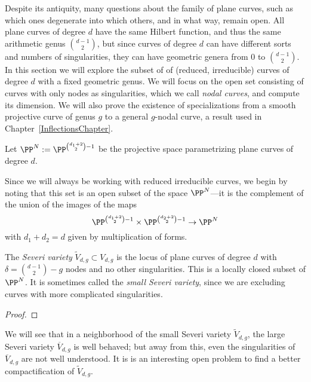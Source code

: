 Despite its antiquity, many questions about the family of plane curves, such as which ones degenerate into which others, and in what way, remain open. All plane curves of degree $d$ have the same Hilbert function, and thus the same arithmetic genus
$\binom{d-1}{2}$, but since curves of degree $d$ can have different sorts and numbers of singularities, they can have geometric genera from 0 to $\binom{d-1}{2}$. In this section we will explore the subset of of (reduced, irreducible) curves of degree $d$ with a fixed geometric genus. We will focus on the open set consisting of curves with only nodes as singularities, which we call \emph{nodal curves}, and compute its dimension. We will also prove the existence of specializations from a smooth projective curve of genus $g$ to a general $g$-nodal curve, a result used in Chapter~\ref{InflectionsChapter}.

Let $\PP^N := \PP^{{d_1+2\choose 2} - 1}$ be the projective space parametrizing plane curves of degree $d$.

Since we will always be working with reduced irreducible curves, we begin by noting that this set is an open subset of the space 
$\PP^N$---it is the complement of the union of the images of the maps 
$$
\PP^{{d_1+2\choose 2} - 1}\times\PP^{{d_2+2\choose 2}-1} \to \PP^N
$$ 
with $d_1+d_2 = d$ given by multiplication of forms.

\def\Vdg{{V_{d,g}}}
\def\Vdgtilde{{\widetilde{V}_{d,g}}} 
\def\Vdgbar{{\overline{V}_{d,g}}} 
\begin{propdef}
The \emph{Severi variety} $\widetilde V_{d,g} \subset V_{d,g}$ is the locus of plane curves of degree $d$ with $\delta = \binom{d-1}{2} - g$ nodes and no other singularities. This is a locally closed subset of $\PP^N$. It is sometimes
called the \emph{small Severi variety}, since we are excluding curves with more complicated singularities.

\end{propdef}

\begin{proof}
\end{proof}

We will see that in a neighborhood of the small Severi variety $\widetilde {V}_{d,g}$,  the large Severi variety $\overline V_{d,g}$  is well behaved; but away from this,
even the singularities of $\overline V_{d,g}$  are not well understood. It is is an interesting open problem to find a better compactification of $\widetilde V_{d,g}$.


